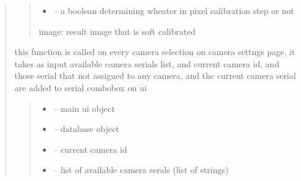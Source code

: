 \documentclass[letterpaper,10pt,english]{sphinxmanual}
\begin{document}
\begin{quote}
\begin{savenotes}
\begin{fulllineitems}
\begin{quote}
\begin{description}
\begin{itemize}
\item {} 
\sphinxAtStartPar
{} – a boolean determining wheater in pixel calibration step or not

\end{itemize}

\sphinxAtStartPar
image: result image that is soft calibrated

\end{description}\end{quote}

\end{fulllineitems}\end{savenotes}


\begin{savenotes}\begin{fulllineitems}
\label{\detokenize{setting/backend/camera_funcs:oxin.backend.camera_funcs.assign_existing_serials_to_ui}}
\pysigstartsignatures
{}
\pysigstopsignatures
\sphinxAtStartPar
this function is called on every camera selection on camera settngs page,
it takes as input available camera serials list, and current camera id, and those serial that not assigned to any camera, and the current camera serial
are added to serial combobox on ui
\begin{quote}\begin{description}
\begin{itemize}
\item {} 
\sphinxAtStartPar
{} – main ui object

\item {} 
\sphinxAtStartPar
{} – database object

\item {} 
\sphinxAtStartPar
{} – current camera id

\item {} 
\sphinxAtStartPar
{} – list of available camera serals (list of strings)


\end{itemize}
\end{description}
\end{quote}
\end{fulllineitems}
\end{savenotes}
\end{quote}
\end{document}
